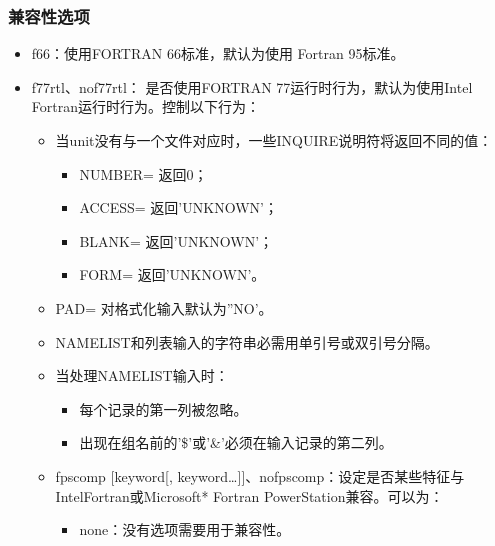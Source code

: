 \documentclass[a4paper,12pt,english]{sphinxmanual}
\begin{document}
\subsubsection{兼容性选项}
\label{\detokenize{compiler/intel:id13}}\begin{itemize}
\item {} 
\sphinxAtStartPar
\sphinxhyphen{}f66：使用FORTRAN 66标准，默认为使用 Fortran 95标准。

\item {} 
\sphinxAtStartPar
\sphinxhyphen{}f77rtl、\sphinxhyphen{}nof77rtl： 是否使用FORTRAN 77运行时行为，默认为使用Intel Fortran运行时行为。控制以下行为：
\begin{itemize}
\item {} 
\sphinxAtStartPar
当unit没有与一个文件对应时，一些INQUIRE说明符将返回不同的值：
\begin{itemize}
\item {} 
\sphinxAtStartPar
NUMBER= 返回0；

\item {} 
\sphinxAtStartPar
ACCESS= 返回’UNKNOWN’；

\item {} 
\sphinxAtStartPar
BLANK= 返回’UNKNOWN’；

\item {} 
\sphinxAtStartPar
FORM= 返回’UNKNOWN’。

\end{itemize}

\item {} 
\sphinxAtStartPar
PAD= 对格式化输入默认为”NO’。

\item {} 
\sphinxAtStartPar
NAMELIST和列表输入的字符串必需用单引号或双引号分隔。

\item {} 
\sphinxAtStartPar
当处理NAMELIST输入时：
\begin{itemize}
\item {} 
\sphinxAtStartPar
每个记录的第一列被忽略。

\item {} 
\sphinxAtStartPar
出现在组名前的’\$’或’\&’必须在输入记录的第二列。

\end{itemize}

\item {} 
\sphinxAtStartPar
\sphinxhyphen{}fpscomp {[}keyword{[}, keyword…{]}{]}、\sphinxhyphen{}nofpscomp：设定是否某些特征与IntelFortran或Microsoft* Fortran PowerStation兼容。可以为：
\begin{itemize}
\item {} 
\sphinxAtStartPar
none：没有选项需要用于兼容性。


\end{itemize}
\end{itemize}
\end{itemize}
\end{document}
